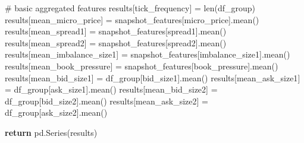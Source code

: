 \documentclass[
  letterpaper,
  DIV=11,
  numbers=noendperiod]{scrartcl}
\newenvironment{Shaded}{\begin{snugshade}}{\end{snugshade}}
\newcommand{\BuiltInTok}[1]{\textcolor[rgb]{0.00,0.23,0.31}{#1}}
\newcommand{\CommentTok}[1]{\textcolor[rgb]{0.37,0.37,0.37}{#1}}
\newcommand{\ControlFlowTok}[1]{\textcolor[rgb]{0.00,0.23,0.31}{\textbf{#1}}}
\newcommand{\NormalTok}[1]{\textcolor[rgb]{0.00,0.23,0.31}{#1}}
\newcommand{\OperatorTok}[1]{\textcolor[rgb]{0.37,0.37,0.37}{#1}}
\newcommand{\StringTok}[1]{\textcolor[rgb]{0.13,0.47,0.30}{#1}}
\begin{document}
\begin{Shaded}
\begin{Highlighting}[]
    \CommentTok{\# basic aggregated features}
\NormalTok{    results[}\StringTok{\textquotesingle{}tick\_frequency\textquotesingle{}}\NormalTok{] }\OperatorTok{=} \BuiltInTok{len}\NormalTok{(df\_group)}
\NormalTok{    results[}\StringTok{\textquotesingle{}mean\_micro\_price\textquotesingle{}}\NormalTok{] }\OperatorTok{=}\NormalTok{ snapshot\_features[}\StringTok{\textquotesingle{}micro\_price\textquotesingle{}}\NormalTok{].mean()}
\NormalTok{    results[}\StringTok{\textquotesingle{}mean\_spread1\textquotesingle{}}\NormalTok{] }\OperatorTok{=}\NormalTok{ snapshot\_features[}\StringTok{\textquotesingle{}spread1\textquotesingle{}}\NormalTok{].mean()}
\NormalTok{    results[}\StringTok{\textquotesingle{}mean\_spread2\textquotesingle{}}\NormalTok{] }\OperatorTok{=}\NormalTok{ snapshot\_features[}\StringTok{\textquotesingle{}spread2\textquotesingle{}}\NormalTok{].mean()}
\NormalTok{    results[}\StringTok{\textquotesingle{}mean\_imbalance\_size1\textquotesingle{}}\NormalTok{] }\OperatorTok{=}\NormalTok{ snapshot\_features[}\StringTok{\textquotesingle{}imbalance\_size1\textquotesingle{}}\NormalTok{].mean()}
\NormalTok{    results[}\StringTok{\textquotesingle{}mean\_book\_pressure\textquotesingle{}}\NormalTok{] }\OperatorTok{=}\NormalTok{ snapshot\_features[}\StringTok{\textquotesingle{}book\_pressure\textquotesingle{}}\NormalTok{].mean()}
\NormalTok{    results[}\StringTok{\textquotesingle{}mean\_bid\_size1\textquotesingle{}}\NormalTok{] }\OperatorTok{=}\NormalTok{ df\_group[}\StringTok{\textquotesingle{}bid\_size1\textquotesingle{}}\NormalTok{].mean()}
\NormalTok{    results[}\StringTok{\textquotesingle{}mean\_ask\_size1\textquotesingle{}}\NormalTok{] }\OperatorTok{=}\NormalTok{ df\_group[}\StringTok{\textquotesingle{}ask\_size1\textquotesingle{}}\NormalTok{].mean()}
\NormalTok{    results[}\StringTok{\textquotesingle{}mean\_bid\_size2\textquotesingle{}}\NormalTok{] }\OperatorTok{=}\NormalTok{ df\_group[}\StringTok{\textquotesingle{}bid\_size2\textquotesingle{}}\NormalTok{].mean()}
\NormalTok{    results[}\StringTok{\textquotesingle{}mean\_ask\_size2\textquotesingle{}}\NormalTok{] }\OperatorTok{=}\NormalTok{ df\_group[}\StringTok{\textquotesingle{}ask\_size2\textquotesingle{}}\NormalTok{].mean()}

    \ControlFlowTok{return}\NormalTok{ pd.Series(results)}
\end{Highlighting}
\end{Shaded}
\end{document}
